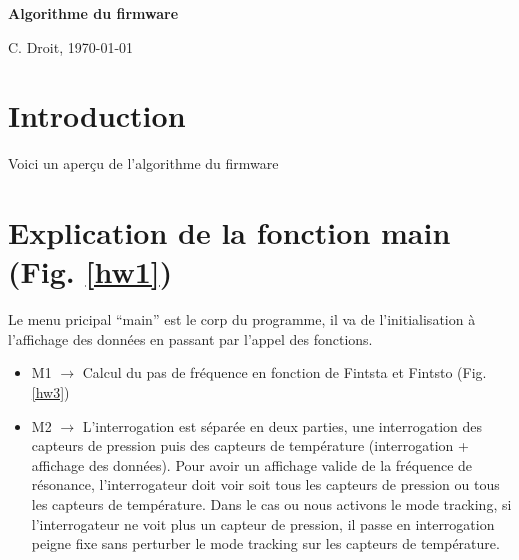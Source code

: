 \documentclass[a4paper]{article}
\begin{document}
\begin{center}{\Large \bf
Algorithme du firmware}

{C. Droit, \today}%
\end{center}



\section{Introduction}
Voici un aper\c cu de l'algorithme du firmware



\section{Explication de la fonction main (Fig. \ref{hw1})}
Le menu pricipal ``main'' est le corp du programme, il va de l'initialisation \`a l'affichage des donn\'ees en passant par l'appel des
fonctions. 
\begin{itemize}
\item M1 $\rightarrow$ Calcul du pas de fr\'equence en fonction de Fintsta et Fintsto (Fig. \ref{hw3})
\item M2 $\rightarrow$ L'interrogation est s\'epar\'ee en deux parties, une interrogation des capteurs de pression puis des capteurs de temp\'erature
 (interrogation + affichage des donn\'ees). Pour avoir un affichage valide de la fr\'equence de r\'esonance, l'interrogateur doit voir soit tous les 
capteurs de pression ou tous les capteurs de temp\'erature. Dans le cas ou nous activons le mode tracking, si l'interrogateur ne voit plus un capteur 
de pression, il passe en interrogation peigne fixe sans perturber le mode tracking sur les capteurs de temp\'erature.
\end{itemize}
\end{document}
